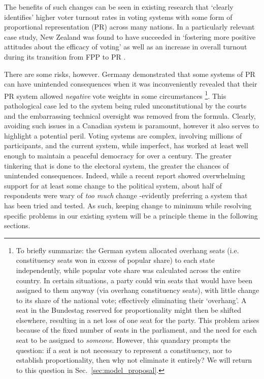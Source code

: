 \documentclass[DIV=calc, paper=a4, fontsize=11pt, twocolumn]{scrartcl}	 %
\begin{document}
The benefits of such changes can be seen in existing research that `clearly identifies' higher voter turnout rates in voting systems with some form of proportional representation (PR) \cite{Blais}
 across many nations. In a particularly relevant case study, New Zealand was found to have succeeded in `fostering more positive attitudes about the efficacy of voting' as well as an increase in overall turnout during its transition from FPP to PR\cite{NZ_PR_results}
 .

There are some risks, however. Germany demonstrated that some systems of PR can have unintended consequences when it was inconveniently revealed that their PR system allowed \emph{negative} vote weights in some circumstances\cite{Die_Zeit_negative_vote} 
\footnote
{
To briefly summarize: the German system allocated overhang seats (i.e. constituency seats won in excess of popular share) to each state independently, while popular vote share was calculated across the entire country.
In certain situations, a party could win seats that would have been assigned to them anyway (via overhang constituency seats), with little change to its share of the national vote; effectively eliminating their `overhang'. A seat in the Bundestag reserved for proportionality might then be shifted elsewhere, resulting in a net loss of one seat for the party.
This problem arises because of the fixed number of seats in the parliament, and the need for each seat to be assigned to \emph{someone}. However, this quandary prompts the question: if a seat is not necessary to represent a constituency, nor to establish proportionality, then why not eliminate it entirely? We will return to this question in Sec.~\ref{sec:model_proposal}.
}.
This pathological case led to the system being ruled unconstitutional by the courts and the embarrassing technical oversight was removed from the formula. 
Clearly, avoiding such issues in a Canadian system is paramount, however it also serves to highlight a potential peril.
Voting systems are complex, involving millions of participants, and the current system, while imperfect, has worked at least well enough to maintain a peaceful democracy for over a century. The greater tinkering that is done to the electoral system, the greater the chances of unintended consequences. 
Indeed, while a recent report\cite{Broadbent_poll} showed overwhelming support for at least some change to the political system, about half of respondents were wary of \emph{too much} change \--evidently preferring a system that has been tried and tested. As such, keeping change to minimum while resolving specific problems in our existing system will be a principle theme in the following sections.
\end{document}
